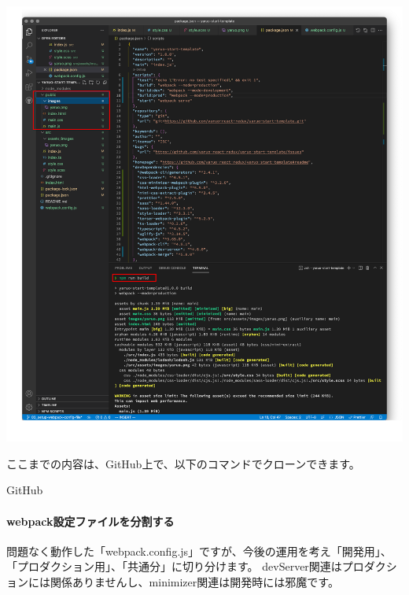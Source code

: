 \begin{reviewimage}%
\includegraphics[width=1.0\maxwidth]{./images/02-create-react-app/webpack_test05.png}%
\label{image:02-create-react-app:webpack_test05}
\end{reviewimage}
\begin{starternote}[]{}

ここまでの内容は、GitHub上で、以下のコマンドでクローンできます。

\def\startercodeblockfontsize{}
\begin{starterterminal}[]{GitHub}\end{starterterminal}
\end{starternote}

\paragraph*{webpack設定ファイルを分割する}
問題なく動作した「webpack.config.js」ですが、今後の運用を考え「開発用」、「プロダクション用」、「共通分」に切り分けます。
devServer関連はプロダクションには関係ありませんし、minimizer関連は開発時には邪魔です。

